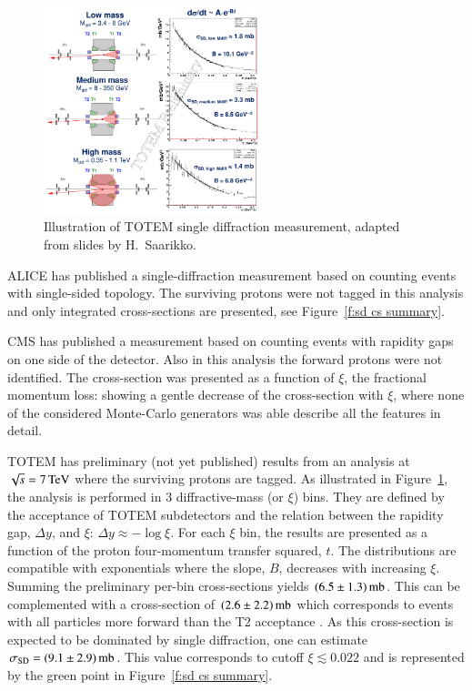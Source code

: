 \documentclass{webofc}
\def\un#1{\,{\rm #1}}
\begin{document}
\begin{figure}[h]
\centering
\includegraphics[height=6cm,clip]{fig/sd_7TeV.png}
\vskip-4mm
\caption{Illustration of TOTEM single diffraction measurement, adapted from slides by H.~Saarikko.}
\label{f:sd TOTEM}
\end{figure}

ALICE has published \cite{alice-inel-sd-dd} a single-diffraction measurement based on counting events with single-sided topology. The surviving protons were not tagged in this analysis and only integrated cross-sections are presented, see Figure~\ref{f:sd cs summary}.

CMS has published \cite{cms-diff-7tev} a measurement based on counting events with rapidity gaps on one side of the detector. Also in this analysis the forward protons were not identified. The cross-section was presented as a function of $\xi$, the fractional momentum loss: showing a gentle decrease of the cross-section with $\xi$, where none of the considered Monte-Carlo generators was able describe all the features in detail.

TOTEM has preliminary (not yet published) results from an analysis at $\sqrt s = 7\un{TeV}$ where the surviving protons are tagged. As illustrated in Figure~\ref{f:sd TOTEM}, the analysis is performed in 3 diffractive-mass (or $\xi$) bins. They are defined by the acceptance of TOTEM subdetectors and the relation between the rapidity gap, $\Delta y$, and $\xi$: $\Delta y \approx -\log\xi$. For each $\xi$ bin, the results are presented as a function of the proton four-momentum transfer squared, $t$. The distributions are compatible with exponentials where the slope, $B$, decreases with increasing $\xi$. Summing the preliminary per-bin cross-sections yields $(6.5\pm 1.3)\un{mb}$. This can be complemented with a cross-section of $(2.6\pm 2.2)\un{mb}$ which corresponds to events with all particles more forward than the T2 acceptance \cite{totem-si-inel-7tev}. As this cross-section is expected to be dominated by single diffraction, one can estimate $\sigma_{\rm SD} = (9.1 \pm 2.9)\un{mb}$. This value corresponds to cutoff $\xi \lesssim 0.022$ and is represented by the green point in Figure~\ref{f:sd cs summary}.
\end{document}
